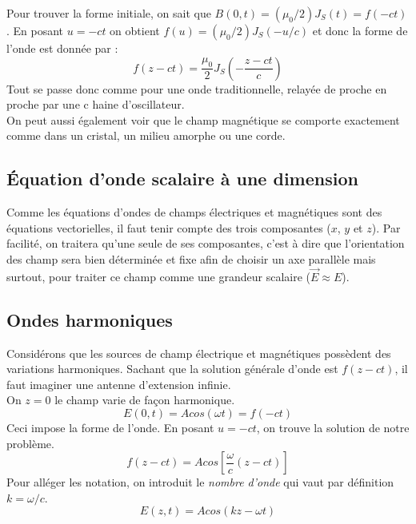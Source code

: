 \documentclass	[11pt, a4paper, openany]{book}
\begin{document}
		Pour trouver la forme initiale, on sait que $B(0,t) = (\mu_0/2)J_S(t) = f(-ct)$. En posant $u = -ct$ on obtient $f(u) = (\mu_0/2)J_S(-u/c)$ et donc la forme de l'onde est donnée par : 
		\begin{equation}
			f(z - ct) = \frac{\mu_0}{2}J_S\left(-\frac{z - ct}{c}\right)
		\end{equation}
		Tout se passe donc comme pour une onde traditionnelle, relayée de proche en proche par une c haine d'oscillateur.\\
		
		On peut aussi également voir que le champ magnétique se comporte exactement comme dans un cristal, un milieu amorphe ou une corde.
		
		\subsection{Équation d'onde scalaire à une dimension}
		Comme les équations d'ondes de champs électriques et magnétiques sont des équations vectorielles, il faut tenir compte des trois composantes ($x$, $y$ et $z$). Par facilité, on traitera qu'une seule de ses composantes, c'est à dire que l'orientation des champ sera bien déterminée et fixe afin de choisir un axe parallèle mais surtout, pour traiter ce champ comme une grandeur scalaire ($\vec{E} \approx E$).
		
		\subsection{Ondes harmoniques}
		Considérons que les sources de champ électrique et magnétiques possèdent des variations harmoniques. Sachant que la solution générale d'onde est $f(z - ct)$, il faut imaginer une antenne d'extension infinie. \\
		On $z = 0$ le champ varie de façon harmonique.
		\begin{equation}
			E(0,t) = Acos(\omega t) = f(-ct)
		\end{equation}
		Ceci impose la forme de l'onde. En posant $u = -ct$, on trouve la solution de notre problème.
		\begin{equation}
			f(z - ct) = Acos\left[\frac{\omega}{c}\left(z - ct\right)\right]
		\end{equation}
		Pour alléger les notation, on introduit le \textit{nombre d'onde} qui vaut par définition $k = \omega / c$.
		\begin{equation}
			E(z,t) = Acos(kz - \omega t)
		\end{equation}
		
\end{document}
